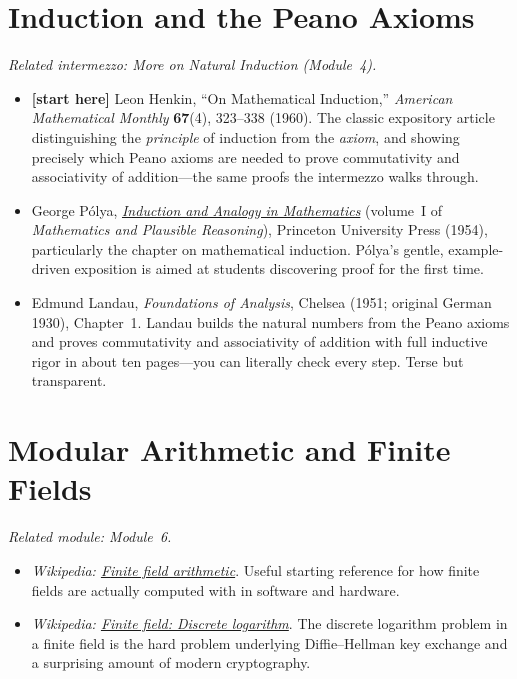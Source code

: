 \documentclass[11pt]{article}
\begin{document}
\section*{Induction and the Peano Axioms}
\emph{Related intermezzo: More on Natural Induction (Module~4).}

\begin{itemize}
  \item \textbf{[start here]} Leon Henkin, ``On Mathematical Induction,'' \emph{American Mathematical Monthly} \textbf{67}(4), 323--338 (1960). The classic expository article distinguishing the \emph{principle} of induction from the \emph{axiom}, and showing precisely which Peano axioms are needed to prove commutativity and associativity of addition---the same proofs the intermezzo walks through.
  \item George P\'olya, \emph{\href{https://press.princeton.edu/books/paperback/9780691025094/mathematics-and-plausible-reasoning-volume-1}{Induction and Analogy in Mathematics}} (volume~I of \emph{Mathematics and Plausible Reasoning}), Princeton University Press (1954), particularly the chapter on mathematical induction. P\'olya's gentle, example-driven exposition is aimed at students discovering proof for the first time.
  \item Edmund Landau, \emph{Foundations of Analysis}, Chelsea (1951; original German 1930), Chapter~1. Landau builds the natural numbers from the Peano axioms and proves commutativity and associativity of addition with full inductive rigor in about ten pages---you can literally check every step. Terse but transparent.
\end{itemize}

\section*{Modular Arithmetic and Finite Fields}
\emph{Related module: Module~6.}

\begin{itemize}
  \item \emph{Wikipedia: \href{https://en.wikipedia.org/wiki/Finite_field_arithmetic}{Finite field arithmetic}}. Useful starting reference for how finite fields are actually computed with in software and hardware.
  \item \emph{Wikipedia: \href{https://en.wikipedia.org/wiki/Finite_field\#Discrete_logarithm}{Finite field: Discrete logarithm}}. The discrete logarithm problem in a finite field is the hard problem underlying Diffie--Hellman key exchange and a surprising amount of modern cryptography.
\end{itemize}
\end{document}
